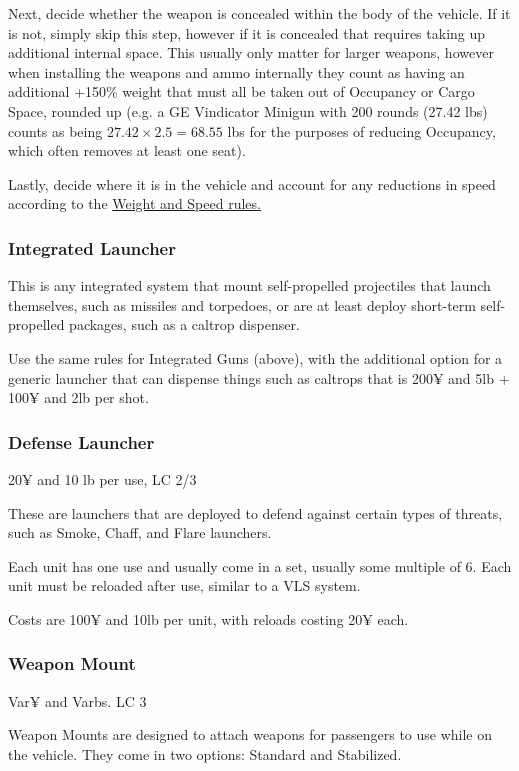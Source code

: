 \begin{multicols*}{2}
	Next, decide whether the weapon is concealed within the body of the vehicle. If it is not, simply skip this step, however if it is concealed that requires taking up additional internal space. This usually only matter for larger weapons, however when installing the weapons and ammo internally they count as having an additional +150\% weight that must all be taken out of Occupancy or Cargo Space, rounded up (e.g. a GE Vindicator Minigun with 200 rounds (27.42 lbs) counts as being $27.42 \times 2.5 = 68.55$ lbs for the purposes of reducing Occupancy, which often removes at least one seat).
	
	Lastly, decide where it is in the vehicle and account for any reductions in speed according to the \hyperref[weight_and_speed]{Weight and Speed rules.}
	
	\subsubsection{Integrated Launcher}
	
	This is any integrated system that mount self-propelled projectiles that launch themselves, such as missiles and torpedoes, or are at least deploy short-term self-propelled packages, such as a caltrop dispenser.
	
	Use the same rules for Integrated Guns (above), with the additional option for a generic launcher that can dispense things such as caltrops that is 200¥ and 5lb + 100¥ and 2lb per shot.
	
	\subsubsection{Defense Launcher}
	20¥ and 10 lb per use, LC 2/3
	
	These are launchers that are deployed to defend against certain types of threats, such as Smoke, Chaff, and Flare launchers.
	
	Each unit has one use and usually come in a set, usually some multiple of 6. Each unit must be reloaded after use, similar to a VLS system.
	
	Costs are 100¥ and 10lb per unit, with reloads costing 20¥ each.
	
	\subsubsection{Weapon Mount}
	Var¥ and Varbs. LC 3
	
	Weapon Mounts are designed to attach weapons for passengers to use while on the vehicle. They come in two options: Standard and Stabilized. 
	

\end{multicols*}
